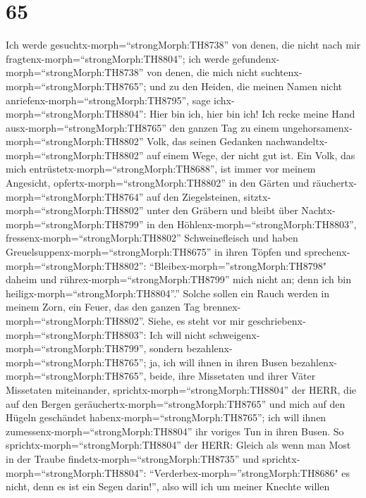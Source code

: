 \hypertarget{section-64}{%
\section{65}\label{section-64}}

 Ich werde gesuchtx-morph=``strongMorph:TH8738'' von denen,
die nicht nach mir fragtenx-morph=``strongMorph:TH8804''; ich werde
gefundenx-morph=``strongMorph:TH8738'' von denen, die mich nicht
suchtenx-morph=``strongMorph:TH8765''; und zu den Heiden, die meinen
Namen nicht anriefenx-morph=``strongMorph:TH8795'', sage
ichx-morph=``strongMorph:TH8804'': Hier bin ich, hier bin ich!
 Ich recke meine Hand ausx-morph=``strongMorph:TH8765'' den
ganzen Tag zu einem ungehorsamenx-morph=``strongMorph:TH8802'' Volk, das
seinen Gedanken nachwandeltx-morph=``strongMorph:TH8802'' auf einem
Wege, der nicht gut ist.  Ein Volk, das mich
entrüstetx-morph=``strongMorph:TH8688'', ist immer vor meinem Angesicht,
opfertx-morph=``strongMorph:TH8802'' in den Gärten und
räuchertx-morph=``strongMorph:TH8764'' auf den Ziegelsteinen,
 sitztx-morph=``strongMorph:TH8802'' unter den Gräbern und
bleibt über Nachtx-morph=``strongMorph:TH8799'' in den
Höhlenx-morph=``strongMorph:TH8803'',
fressenx-morph=``strongMorph:TH8802'' Schweinefleisch und haben
Greuelsuppenx-morph=``strongMorph:TH8675'' in ihren Töpfen 
und sprechenx-morph=``strongMorph:TH8802'':
``Bleibex-morph=''strongMorph:TH8798" daheim und
rührex-morph=``strongMorph:TH8799'' mich nicht an; denn ich bin
heiligx-morph=``strongMorph:TH8804''.'' Solche sollen ein Rauch werden
in meinem Zorn, ein Feuer, das den ganzen Tag
brennex-morph=``strongMorph:TH8802''.  Siehe, es steht vor
mir geschriebenx-morph=``strongMorph:TH8803'': Ich will nicht
schweigenx-morph=``strongMorph:TH8799'', sondern
bezahlenx-morph=``strongMorph:TH8765''; ja, ich will ihnen in ihren
Busen bezahlenx-morph=``strongMorph:TH8765'',  beide, ihre
Missetaten und ihrer Väter Missetaten miteinander,
sprichtx-morph=``strongMorph:TH8804'' der HERR, die auf den Bergen
geräuchertx-morph=``strongMorph:TH8765'' und mich auf den Hügeln
geschändet habenx-morph=``strongMorph:TH8765''; ich will ihnen
zumessenx-morph=``strongMorph:TH8804'' ihr voriges Tun in ihren Busen.
 So sprichtx-morph=``strongMorph:TH8804'' der HERR: Gleich
als wenn man Most in der Traube findetx-morph=``strongMorph:TH8735'' und
sprichtx-morph=``strongMorph:TH8804'':
``Verderbex-morph=''strongMorph:TH8686" es nicht, denn es ist ein Segen
darin!'', also will ich um meiner Knechte willen
